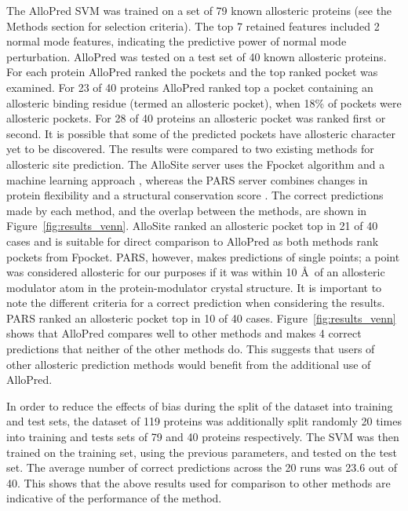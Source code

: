 The AlloPred SVM was trained on a set of 79 known allosteric proteins (see the Methods section for selection criteria).
The top 7 retained features included 2 normal mode features, indicating the predictive power of normal mode perturbation.
AlloPred was tested on a test set of 40 known allosteric proteins.
For each protein AlloPred ranked the pockets and the top ranked pocket was examined.
For 23 of 40 proteins AlloPred ranked top a pocket containing an allosteric binding residue (termed an allosteric pocket), when 18\% of pockets were allosteric pockets.
For 28 of 40 proteins an allosteric pocket was ranked first or second.
It is possible that some of the predicted pockets have allosteric character yet to be discovered.
The results were compared to two existing methods for allosteric site prediction.
The AlloSite server uses the Fpocket algorithm and a machine learning approach \cite{Huang2013}, whereas the PARS server combines changes in protein flexibility and a structural conservation score \cite{Panjkovich2014}.
The correct predictions made by each method, and the overlap between the methods, are shown in Figure~\ref{fig:results_venn}.
AlloSite ranked an allosteric pocket top in 21 of 40 cases and is suitable for direct comparison to AlloPred as both methods rank pockets from Fpocket.
PARS, however, makes predictions of single points; a point was considered allosteric for our purposes if it was within 10 \AA\ of an allosteric modulator atom in the protein-modulator crystal structure.
It is important to note the different criteria for a correct prediction when considering the results.
PARS ranked an allosteric pocket top in 10 of 40 cases.
Figure~\ref{fig:results_venn} shows that AlloPred compares well to other methods and makes 4 correct predictions that neither of the other methods do.
This suggests that users of other allosteric prediction methods would benefit from the additional use of AlloPred.

In order to reduce the effects of bias during the split of the dataset into training and test sets, the dataset of 119 proteins was additionally split randomly 20 times into training and tests sets of 79 and 40 proteins respectively.
The SVM was then trained on the training set, using the previous parameters, and tested on the test set.
The average number of correct predictions across the 20 runs was 23.6 out of 40.
This shows that the above results used for comparison to other methods are indicative of the performance of the method.


